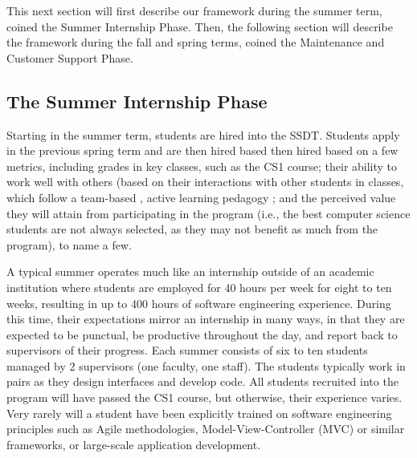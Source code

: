 This next section will first describe our framework during the summer term, coined the Summer Internship Phase. Then, the following section will describe the framework during the fall and spring terms, coined the Maintenance and Customer Support Phase.

\subsection{The Summer Internship Phase}
Starting in the summer term, students are hired into the SSDT. Students apply in the previous spring term and are then hired based then hired based on a few metrics, including grades in key classes, such as the CS1 course; their ability to work well with others (based on their interactions with other students in classes, which follow a team-based \cite{2002PairProgramming}, active learning pedagogy \cite{2012Pogil}; and the perceived value they will attain from participating in the program (i.e., the best computer science students are not always selected, as they may not benefit as much from the program), to name a few.

A typical summer operates much like an internship outside of an academic institution where students are employed for 40 hours per week for eight to ten weeks, resulting in up to 400 hours of software engineering experience. During this time, their expectations mirror an internship in many ways, in that they are expected to be punctual, be productive throughout the day, and report back to supervisors of their progress. Each summer consists of six to ten students managed by 2 supervisors (one faculty, one staff). The students typically work in pairs as they design interfaces and develop code. All students recruited into the program will have passed the CS1 course, but otherwise, their experience varies. Very rarely will a student have been explicitly trained on software engineering principles such as Agile methodologies, Model-View-Controller (MVC) or similar frameworks, or large-scale application development.


